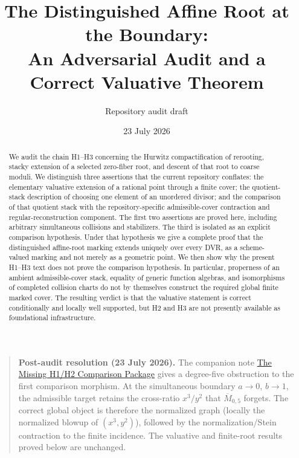 \documentclass[11pt]{article}
\title{The Distinguished Affine Root at the Boundary:\\
An Adversarial Audit and a Correct Valuative Theorem}
\author{Repository audit draft}
\date{23 July 2026}
\begin{document}
\maketitle

\begin{abstract}
We audit the chain H1--H3 concerning the Hurwitz compactification of
rerooting, stacky extension of a selected zero-fiber root, and descent of
that root to coarse moduli.  We distinguish three assertions that the
current repository conflates: the elementary valuative extension of a
rational point through a finite cover; the quotient-stack description of
choosing one element of an unordered divisor; and the comparison of that
quotient stack with the repository-specific admissible-cover contraction
and regular-reconstruction component.  The first two assertions are proved
here, including arbitrary simultaneous collisions and stabilizers.  The
third is isolated as an explicit comparison hypothesis.  Under that
hypothesis we give a complete proof that the distinguished affine-root
marking extends uniquely over every DVR, as a scheme-valued marking and not
merely as a geometric point.  We then show why the present H1--H3 text does
not prove the comparison hypothesis.  In particular, properness of an
ambient admissible-cover stack, equality of generic function algebras, and
isomorphisms of completed collision charts do not by themselves construct
the required global finite marked cover.  The resulting verdict is that the
valuative statement is correct conditionally and locally well supported,
but H2 and H3 are not presently available as foundational infrastructure.
\end{abstract}

\begin{quote}
\textbf{Post-audit resolution (23 July 2026).}
The companion note
\href{global-comparison-obstruction.tex}{The Missing H1/H2 Comparison
Package} gives a degree-five obstruction to the first comparison morphism.
At the simultaneous boundary $a\to0$, $b\to1$, the admissible target retains
the cross-ratio $x^3/y^2$ that $\overline M_{0,5}$ forgets.  The correct
global object is therefore the normalized graph (locally the normalized
blowup of $(x^3,y^2)$), followed by the normalization/Stein contraction to
the finite incidence.  The valuative and finite-root results proved below
are unchanged.
\end{quote}
\end{document}

